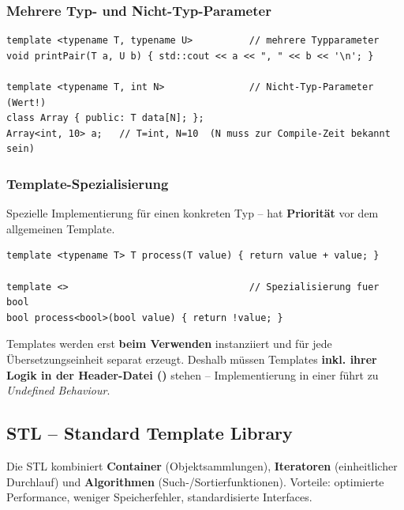 \subsubsection*{Mehrere Typ- und Nicht-Typ-Parameter}
\begin{lstlisting}
template <typename T, typename U>          // mehrere Typparameter
void printPair(T a, U b) { std::cout << a << ", " << b << '\n'; }

template <typename T, int N>               // Nicht-Typ-Parameter (Wert!)
class Array { public: T data[N]; };
Array<int, 10> a;   // T=int, N=10  (N muss zur Compile-Zeit bekannt sein)
\end{lstlisting}

\subsubsection*{Template-Spezialisierung}
Spezielle Implementierung f\"ur einen konkreten Typ -- hat \textbf{Priorit\"at} vor dem allgemeinen Template.
\begin{lstlisting}
template <typename T> T process(T value) { return value + value; }

template <>                                // Spezialisierung fuer bool
bool process<bool>(bool value) { return !value; }
\end{lstlisting}

\begin{merke}
Templates werden erst \textbf{beim Verwenden} instanziiert und f\"ur jede \"Ubersetzungseinheit separat erzeugt. Deshalb m\"ussen Templates \textbf{inkl. ihrer Logik in der Header-Datei ()} stehen -- Implementierung in einer  f\"uhrt zu \emph{Undefined Behaviour}.
\end{merke}

\subsection{STL -- Standard Template Library}
Die STL kombiniert \textbf{Container} (Objektsammlungen), \textbf{Iteratoren} (einheitlicher Durchlauf) und \textbf{Algorithmen} (Such-/Sortierfunktionen). Vorteile: optimierte Performance, weniger Speicherfehler, standardisierte Interfaces.

